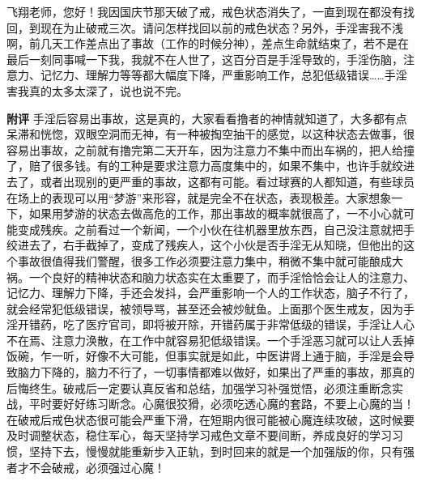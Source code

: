 \begin{case}
    飞翔老师，您好！我因国庆节那天破了戒，戒色状态消失了，一直到现在都没有找回，到现在为止破戒三次。请问怎样找回以前的戒色状态？另外，手淫害我不浅啊，前几天工作差点出了事故（工作的时候分神），差点生命就结束了，若不是在最后一刻同事喊一下我，我就不在人世了，这百分百是手淫导致的，手淫伤脑，注意力、记忆力、理解力等等都大幅度下降，严重影响工作，总犯低级错误……手淫害我真的太多太深了，说也说不完。

    \textbf{附评} 手淫后容易出事故，这是真的，大家看看撸者的神情就知道了，大多都有点呆滞和恍惚，双眼空洞而无神，有一种被掏空抽干的感觉，以这种状态去做事，很容易出事故，之前就有撸完第二天开车，因为注意力不集中而出车祸的，把人给撞了，赔了很多钱。有的工种是要求注意力高度集中的，如果不集中，也许手就绞进去了，或者出现别的更严重的事故，这都有可能。看过球赛的人都知道，有些球员在场上的表现可以用“梦游”来形容，就是完全不在状态，表现极差。大家想象一下，如果用梦游的状态去做高危的工作，那出事故的概率就很高了，一不小心就可能变成残疾。之前看过一个新闻，一个小伙在往机器里放东西，自己没注意就把手绞进去了，右手截掉了，变成了残疾人，这个小伙是否手淫无从知晓，但他出的这个事故很值得我们警醒，很多工作必须要注意力集中，稍微不集中就可能酿成大祸。一个良好的精神状态和脑力状态实在太重要了，而手淫恰恰会让人的注意力、记忆力、理解力下降，手还会发抖，会严重影响一个人的工作状态，脑子不行了，就会经常犯低级错误，被领导骂，甚至还会被炒鱿鱼。上面那个医生戒友，因为手淫开错药，吃了医疗官司，即将被开除，开错药属于非常低级的错误，手淫让人心不在焉、注意力涣散，在工作中就容易犯低级错误。一个手淫恶习就可以让人丢掉饭碗，乍一听，好像不大可能，但事实就是如此，中医讲肾上通于脑，手淫是会导致脑力下降的，脑力不行了，一切事情都难以做好，如果出了严重的事故，那真的后悔终生。破戒后一定要认真反省和总结，加强学习补强觉悟，必须注重断念实战，平时要好好练习断念。心魔很狡猾，必须吃透心魔的套路，不要上心魔的当！在破戒后戒色状态很可能会严重下滑，在短期内很可能被心魔连续攻破，这时候要及时调整状态，稳住军心，每天坚持学习戒色文章不要间断，养成良好的学习习惯，坚持下去，慢慢就能重新步入正轨，到时回来的就是一个加强版的你，只有强者才不会破戒，必须强过心魔！
\end{case}

